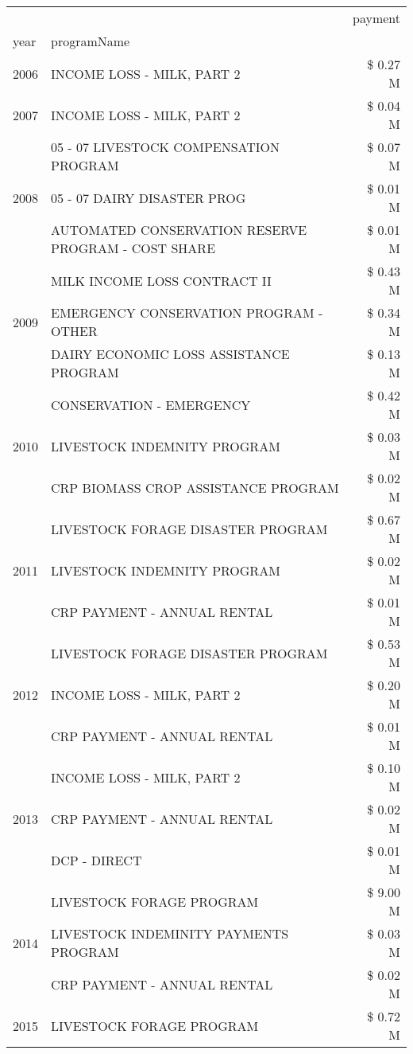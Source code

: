 \begin{tabular}{llr}
\toprule
 &  & payment \\
year & programName &  \\
\midrule
2006 & INCOME LOSS - MILK, PART 2 & \$ 0.27 M \\
\cline{1-3}
2007 & INCOME LOSS - MILK, PART 2 & \$ 0.04 M \\
\cline{1-3}
\multirow[t]{3}{*}{2008} & 05 - 07 LIVESTOCK COMPENSATION PROGRAM & \$ 0.07 M \\
 & 05 - 07 DAIRY DISASTER PROG & \$ 0.01 M \\
 & AUTOMATED CONSERVATION RESERVE PROGRAM - COST SHARE & \$ 0.01 M \\
\cline{1-3}
\multirow[t]{3}{*}{2009} & MILK INCOME LOSS CONTRACT II & \$ 0.43 M \\
 & EMERGENCY CONSERVATION PROGRAM - OTHER & \$ 0.34 M \\
 & DAIRY ECONOMIC LOSS ASSISTANCE PROGRAM & \$ 0.13 M \\
\cline{1-3}
\multirow[t]{3}{*}{2010} & CONSERVATION - EMERGENCY & \$ 0.42 M \\
 & LIVESTOCK INDEMNITY PROGRAM & \$ 0.03 M \\
 & CRP BIOMASS CROP ASSISTANCE PROGRAM & \$ 0.02 M \\
\cline{1-3}
\multirow[t]{3}{*}{2011} & LIVESTOCK FORAGE DISASTER PROGRAM & \$ 0.67 M \\
 & LIVESTOCK INDEMNITY PROGRAM & \$ 0.02 M \\
 & CRP PAYMENT - ANNUAL RENTAL & \$ 0.01 M \\
\cline{1-3}
\multirow[t]{3}{*}{2012} & LIVESTOCK FORAGE DISASTER PROGRAM & \$ 0.53 M \\
 & INCOME LOSS - MILK, PART 2 & \$ 0.20 M \\
 & CRP PAYMENT - ANNUAL RENTAL & \$ 0.01 M \\
\cline{1-3}
\multirow[t]{3}{*}{2013} & INCOME LOSS - MILK, PART 2 & \$ 0.10 M \\
 & CRP PAYMENT - ANNUAL RENTAL & \$ 0.02 M \\
 & DCP - DIRECT & \$ 0.01 M \\
\cline{1-3}
\multirow[t]{3}{*}{2014} & LIVESTOCK FORAGE PROGRAM & \$ 9.00 M \\
 & LIVESTOCK INDEMINITY PAYMENTS PROGRAM & \$ 0.03 M \\
 & CRP PAYMENT - ANNUAL RENTAL & \$ 0.02 M \\
\cline{1-3}
\multirow[t]{3}{*}{2015} & LIVESTOCK FORAGE PROGRAM & \$ 0.72 M \\

\end{tabular}
